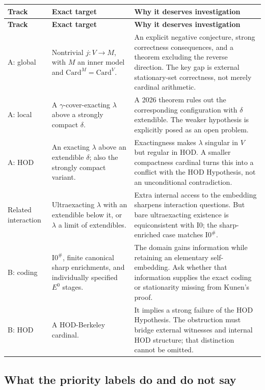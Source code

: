 \documentclass[11pt,letterpaper]{article}
\theoremstyle{definition}
\newcommand{\Card}{\mathrm{Card}}
\newcommand{\Izero}{\mathrm{I0}}
\newcommand{\Isharp}{\mathrm{I0}^{\#}}
\begin{document}
\begingroup\small
\renewcommand{\arraystretch}{1.15}
\begin{longtable}{@{}P{.14\textwidth}P{.29\textwidth}P{.50\textwidth}@{}}
\toprule
\textbf{Track} & \textbf{Exact target} & \textbf{Why it deserves investigation}\\
\midrule\endfirsthead
\toprule\textbf{Track}&\textbf{Exact target}&\textbf{Why it deserves investigation}\\\midrule\endhead
A: global & Nontrivial $j:V\to M$, with $M$ an inner model and $\Card^M=\Card^V$. & An explicit negative conjecture, strong correctness consequences, and a theorem excluding the reverse direction. The key gap is external stationary-set correctness, not merely cardinal arithmetic. \cite{goldbergcp,goldbergthei}\\[5pt]
A: local & A $\gamma$-cover-exacting $\lambda$ above a strongly compact $\delta$. & A 2026 theorem rules out the corresponding configuration with $\delta$ extendible. The weaker hypothesis is explicitly posed as an open problem. \cite{cover}\\[5pt]
A: HOD & An exacting $\lambda$ above an extendible $\delta$; also the strongly compact variant. & Exactingness makes $\lambda$ singular in $V$ but regular in HOD. A smaller compactness cardinal turns this into a conflict with the HOD Hypothesis, not an unconditional contradiction. \cite{abl,abgl,goldberghod}\\[5pt]
Related interaction & Ultraexacting $\lambda$ with an extendible below it, or $\lambda$ a limit of extendibles. & Extra internal access to the embedding sharpens interaction questions. But bare ultraexacting existence is equiconsistent with $\Izero$; the sharp-enriched case matches $\Isharp$. \cite{abl,abgl}\\[5pt]
B: coding & $\Isharp$, finite canonical sharp enrichments, and individually specified $E^0$ stages. & The domain gains information while retaining an elementary self-embedding. Ask whether that information supplies the exact coding or stationarity missing from Kunen's proof. \cite{dimonte,ld,abgl}\\[5pt]
B: HOD & A HOD-Berkeley cardinal. & It implies a strong failure of the HOD Hypothesis. The obstruction must bridge external witnesses and internal HOD structure; that distinction cannot be omitted. \cite{bkw,cutolo}\\
\bottomrule
\end{longtable}
\endgroup

\subsection{What the priority labels do and do not say}
\end{document}
